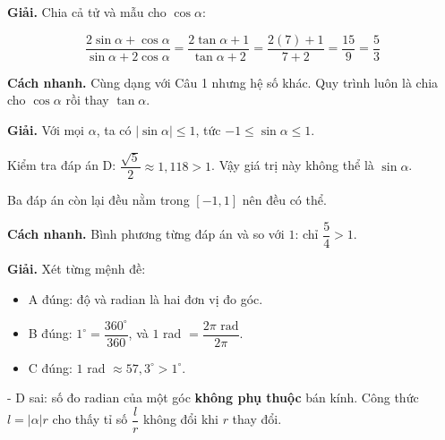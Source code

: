 \documentclass[11pt, a4paper]{article}
\begin{document}
\begin{dapan}[8 — Đáp án A]
\textbf{Giải.} Chia cả tử và mẫu cho $\cos\alpha$:

$$\frac{2\sin\alpha + \cos\alpha}{\sin\alpha + 2\cos\alpha} = \frac{2\tan\alpha + 1}{\tan\alpha + 2} = \frac{2(7)+1}{7+2} = \frac{15}{9} = \frac{5}{3}$$

\textbf{Cách nhanh.} Cùng dạng với Câu 1 nhưng hệ số khác. Quy trình luôn là chia cho $\cos\alpha$ rồi thay $\tan\alpha$.
\end{dapan}

\begin{dapan}[9 — Đáp án D]
\textbf{Giải.} Với mọi $\alpha$, ta có $|\sin\alpha| \le 1$, tức $-1 \le \sin\alpha \le 1$.

Kiểm tra đáp án D: $\dfrac{\sqrt{5}}{2} \approx 1{,}118 > 1$. Vậy giá trị này không thể là $\sin\alpha$.

Ba đáp án còn lại đều nằm trong $[-1,1]$ nên đều có thể.

\textbf{Cách nhanh.} Bình phương từng đáp án và so với $1$: chỉ $\dfrac{5}{4} > 1$.
\end{dapan}

\begin{dapan}[10 — Đáp án D]
\textbf{Giải.} Xét từng mệnh đề:
\begin{itemize}[leftmargin=1.4em, itemsep=2pt]
\item A đúng: độ và radian là hai đơn vị đo góc.
\item B đúng: $1^\circ = \dfrac{360^\circ}{360}$, và $1$ rad $= \dfrac{2\pi \text{ rad}}{2\pi}$.
\item C đúng: $1$ rad $\approx 57{,}3^\circ > 1^\circ$.
\end{itemize}

- D sai: số đo radian của một góc \textbf{không phụ thuộc} bán kính. Công thức $l = |\alpha|r$ cho thấy tỉ số $\dfrac{l}{r}$ không đổi khi $r$ thay đổi.
\end{dapan}
\end{document}
